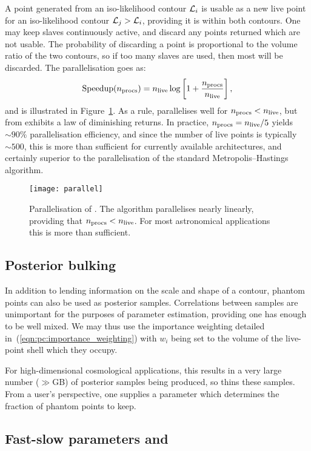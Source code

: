 A point generated from an iso-likelihood contour $\mathcal{L}_i$ is usable as a new live point for an iso-likelihood contour $\mathcal{L}_j>\mathcal{L}_i$, providing it is within both contours.  One may keep slaves continuously active, and discard any points returned which are not usable.  The probability of discarding a point is proportional to the volume ratio of the two contours, so if too many slaves are used, then most will be discarded.  The parallelisation goes as:
\begin{equation}
  \text{Speedup}(n_{\mathrm{procs}}) = n_{\mathrm{live}}\log\left[ 1 + \frac{n_{\mathrm{procs}}}{n_{\mathrm{live}}} \right],
  \label{eqn:pc:parallel}
\end{equation}
and is illustrated in Figure~\ref{fig:pc:parallel}. 
As a rule, \PolyChord{} parallelises well for $n_{\mathrm{procs}}<n_{\mathrm{live}}$, but from exhibits a law of diminishing returns. In practice, $n_{\mathrm{procs}} = n_{\mathrm{live}}/5$ yields $\sim90\%$ parallelisation efficiency, and
since the number of live points is typically $\sim500$, this is more than sufficient for currently available \openMPI{} architectures, and certainly superior to the parallelisation of the standard Metropolis--Hastings algorithm.
%
\begin{figure}
  \centering
  \texttt{[image: parallel]}
  \caption{%
Parallelisation of \PolyChord{}. 
The algorithm parallelises nearly linearly, providing that $n_{\mathrm{procs}}<n_{\mathrm{live}}$. For most astronomical applications this is more than sufficient.\label{fig:pc:parallel}}
\end{figure}
%
\subsection{Posterior bulking}
\label{sec:pc:posterior_bulking}
In addition to lending information on the scale and shape of a contour, phantom points can also be used as posterior samples. Correlations between samples are unimportant for the purposes of parameter estimation, providing one has enough to be well mixed. We may thus use the importance weighting detailed in~(\ref{eqn:pc:importance_weighting}) with $w_i$ being set to the volume of the live-point shell which they occupy.

For high-dimensional cosmological applications, this results in a very large number ($\gg$GB) of posterior samples being produced, so \PolyChord{} thins these samples. From a user's perspective, one supplies a parameter which determines the fraction of phantom points to keep.

\subsection{Fast-slow parameters and \CosmoChord}
\label{sec:pc:fast_slow}

